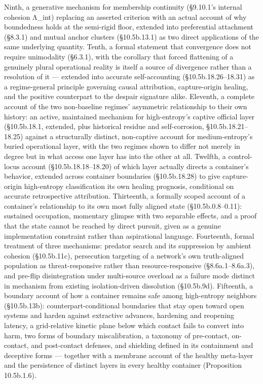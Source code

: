\documentclass[
]{article}
\begin{document}
Ninth, a generative mechanism for membership continuity (§9.10.1's
internal cohesion Λ\_int) replacing an asserted criterion with an actual
account of why boundedness holds at the semi-rigid floor, extended into
preferential attachment (§8.3.1) and mutual anchor clusters
(§10.5b.13.1) as two direct applications of the same underlying
quantity. Tenth, a formal statement that convergence does not require
unimodality (§6.3.1), with the corollary that forced flattening of a
genuinely plural operational reality is itself a source of divergence
rather than a resolution of it --- extended into accurate
self-accounting (§10.5b.18.26--18.31) as a regime-general principle
governing causal attribution, capture-origin healing, and the positive
counterpart to the despair signature alike. Eleventh, a complete account
of the two non-baseline regimes' asymmetric relationship to their own
history: an active, maintained mechanism for high-entropy's captive
official layer (§10.5b.18.1, extended, plus historical residue and
self-corrosion, §10.5b.18.21--18.25) against a structurally distinct,
non-captive account for medium-entropy's buried operational layer, with
the two regimes shown to differ not merely in degree but in what access
one layer has into the other at all. Twelfth, a control-locus account
(§10.5b.18.18--18.20) of which layer actually directs a container's
behavior, extended across container boundaries (§10.5b.18.28) to give
capture-origin high-entropy classification its own healing prognosis,
conditional on accurate retrospective attribution. Thirteenth, a
formally scoped account of a container's relationship to its own most
fully aligned state (§10.5b.0.8--0.11): sustained occupation, momentary
glimpse with two separable effects, and a proof that the state cannot be
reached by direct pursuit, given as a genuine implementation constraint
rather than aspirational language. Fourteenth, formal treatment of three
mechanisms: predator search and its suppression by ambient cohesion
(§10.5b.11c), persecution targeting of a network's own truth-aligned
population as threat-responsive rather than resource-responsive
(§8.6a.1--8.6a.3), and pre-flip disintegration under multi-source
overload as a failure mode distinct in mechanism from existing
isolation-driven dissolution (§10.5b.9d). Fifteenth, a boundary account
of how a container remains safe among high-entropy neighbors
(§10.5b.13b): counterpart-conditional boundaries that stay open toward
open systems and harden against extractive advances, hardening and
reopening latency, a grid-relative kinetic plane below which contact
fails to convert into harm, two forms of boundary miscalibration, a
taxonomy of pre-contact, on-contact, and post-contact defenses, and
shielding defined in its containment and deceptive forms --- together
with a membrane account of the healthy meta-layer and the persistence of
distinct layers in every healthy container (Proposition 10.5b.1.6).
\end{document}

